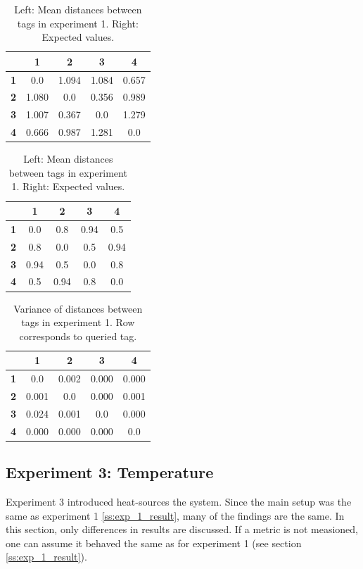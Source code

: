 \begin{table}[h!]
	\centering
	\begin{tabular}{|c|c c c c|}
		\hline
		& \textbf{1} & \textbf{2} & \textbf{3} & \textbf{4} \\
		\hline
		\textbf{1} & 0.0 & 1.094 & 1.084 & 0.657 \\
		\textbf{2} & 1.080 & 0.0 & 0.356 & 0.989 \\
		\textbf{3} & 1.007 & 0.367 & 0.0 & 1.279 \\
		\textbf{4} & 0.666 & 0.987 & 1.281 & 0.0 \\
		\hline
	\end{tabular}
	\begin{tabular}{|c|c c c c|}
		\hline
		& \textbf{1} & \textbf{2} & \textbf{3} & \textbf{4} \\
		\hline
		\textbf{1} & 0.0 & 0.8 & 0.94 & 0.5 \\
		\textbf{2} & 0.8 & 0.0 & 0.5 & 0.94 \\
		\textbf{3} & 0.94 & 0.5 & 0.0 & 0.8 \\
		\textbf{4} & 0.5 & 0.94 & 0.8 & 0.0 \\
		\hline
	\end{tabular}
	\caption{Left: Mean distances between tags in experiment 1. Right: Expected values.}
	\label{t:exp1_dist_means}
\end{table}

\begin{table}[h!]
	\centering
	\begin{tabular}{|c|c c c c|}
		\hline
		& \textbf{1} & \textbf{2} & \textbf{3} & \textbf{4} \\
		\hline
		\textbf{1} & 0.0 & 0.002 & 0.000 & 0.000 \\
		\textbf{2} & 0.001 & 0.0 & 0.000 & 0.001 \\
		\textbf{3} & 0.024 & 0.001 & 0.0 & 0.000 \\
		\textbf{4} & 0.000 & 0.000 & 0.000 & 0.0 \\
		\hline
	\end{tabular}
	\caption{Variance of distances between tags in experiment 1. Row corresponds to queried tag.}
	\label{t:exp1_dist_var}
\end{table}

\subsection{Experiment 3: Temperature}
\label{ss:exp_3_result}
Experiment 3 introduced heat-sources the system.
Since the main setup was the same as experiment 1 \ref{ss:exp_1_result}, many of the findings are the same.
In this section, only differences in results are discussed.
If a metric is not measioned, one can assume it behaved the same as for experiment 1  (see section \ref{ss:exp_1_result}).

